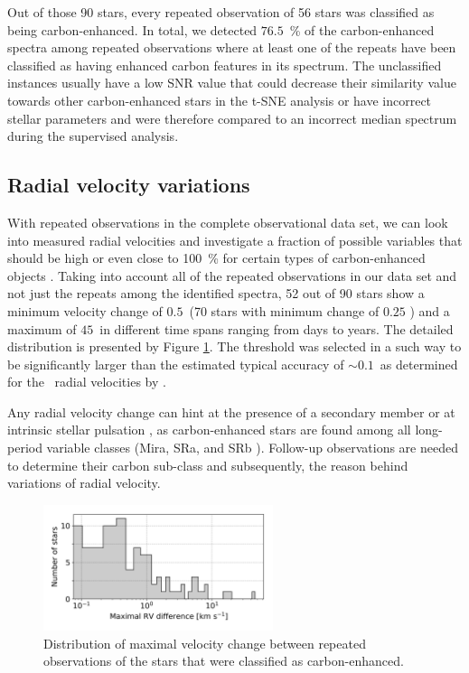 Out of those 90 stars, every repeated observation of 56 stars was classified as being carbon-enhanced. In total, we detected $76.5$~\% of the carbon-enhanced spectra among repeated observations where at least one of the repeats have been classified as having enhanced carbon features in its spectrum. The unclassified instances usually have a low SNR value that could decrease their similarity value towards other carbon-enhanced stars in the t-SNE analysis or have incorrect stellar parameters and were therefore compared to an incorrect median spectrum during the supervised analysis.

\subsection{Radial velocity variations}
\label{sec:binaries}
With repeated observations in the complete observational data set, we can look into measured radial velocities and investigate a fraction of possible variables that should be high or even close to 100~\% for certain types of carbon-enhanced objects \citet{2016ApJ...826...85S}. Taking into account all of the repeated observations in our data set and not just the repeats among the identified spectra, 52 out of 90 stars show a minimum velocity change of $0.5$~\kms (70 stars with minimum change of $0.25$ \kms) and a maximum of $45$~\kms in different time spans ranging from days to years. The detailed distribution is presented by Figure \ref{fig:rv_rep_dist}. The threshold was selected in a such way to be significantly larger than the estimated typical accuracy of $\sim0.1$~\kms as determined for the \Gh\ radial velocities by \citet{2018arXiv180406344Z}.

Any radial velocity change can hint at the presence of a secondary member or at intrinsic stellar pulsation \cite{2002AA...390..987B, 2010JApA...31..177L, 2012A&A...544A..10B}, as carbon-enhanced stars are found among all long-period variable classes (Mira, SRa, and SRb  \cite{2013A&A...553A..93B, 2014A&A...568A.100B}). Follow-up observations are needed to determine their carbon sub-class and subsequently, the reason behind variations of radial velocity.

\begin{figure}
	\centering
	\includegraphics[width=0.6\textwidth]{rv_rep_dist.png}
	\caption{Distribution of maximal velocity change between repeated observations of the stars that were classified as carbon-enhanced.}
	\label{fig:rv_rep_dist}
\end{figure}

